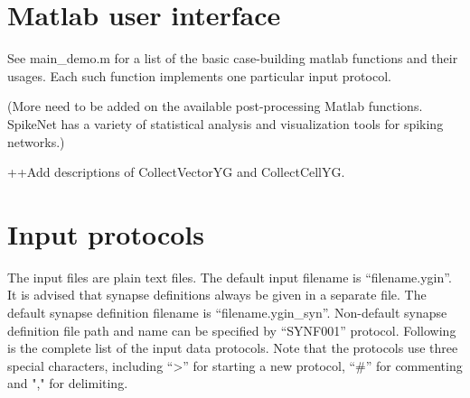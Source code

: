 \documentclass{article}
\begin{document}
%	





\section{Matlab user interface}
\label{sec:matlab user interface}
See main\_demo.m for a list of the basic case-building matlab functions and their usages. Each such function implements one particular input protocol. 


(More need to be added on the available post-processing Matlab functions. SpikeNet has a variety of statistical analysis and visualization tools for spiking networks.)

++Add  descriptions of CollectVectorYG and CollectCellYG.

\section{Input protocols}
\label{sec:Input protocols}

The input files are plain text files.
The default input filename is ``filename.ygin''.
It is advised that synapse definitions always be given in a separate file.
The default synapse definition filename is ``filename.ygin\_syn''.
Non-default synapse definition file path and name can be specified by ``SYNF001'' protocol.
Following is the complete list of the input data protocols.
Note that the protocols use three special characters, including ``\textgreater'' for starting a new protocol, ``\#'' for commenting and "," for delimiting.
\end{document}

